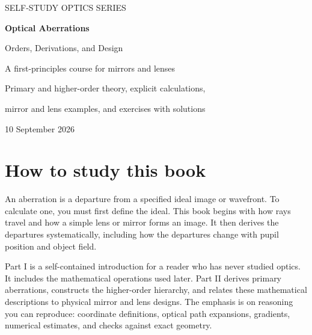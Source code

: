 \documentclass[11pt,a4paper,oneside,openany]{book}
\begin{document}
\frontmatter
\hypersetup{pageanchor=false}
\begin{titlepage}
\centering
\vspace*{18mm}
{\large SELF-STUDY OPTICS SERIES\par}
\vspace{17mm}
{\Huge\bfseries Optical Aberrations\par}
\vspace{6mm}
{\LARGE Orders, Derivations, and Design\par}
\vspace{13mm}
{\Large A first-principles course for mirrors and lenses\par}
\vspace{18mm}
\vfill
{\large Primary and higher-order theory, explicit calculations,\par mirror and lens examples, and exercises with solutions\par}
\vspace{8mm}
{10 September 2026\par}
\end{titlepage}
\hypersetup{pageanchor=true}
\setcounter{page}{1}
\chapter*{How to study this book}
An aberration is a departure from a specified ideal image or wavefront. To calculate one, you must first define the ideal. This book begins with how rays travel and how a simple lens or mirror forms an image. It then derives the departures systematically, including how the departures change with pupil position and object field.

Part I is a self-contained introduction for a reader who has never studied optics. It includes the mathematical operations used later. Part II derives primary aberrations, constructs the higher-order hierarchy, and relates these mathematical descriptions to physical mirror and lens designs. The emphasis is on reasoning you can reproduce: coordinate definitions, optical path expansions, gradients, numerical estimates, and checks against exact geometry.
\end{document}
